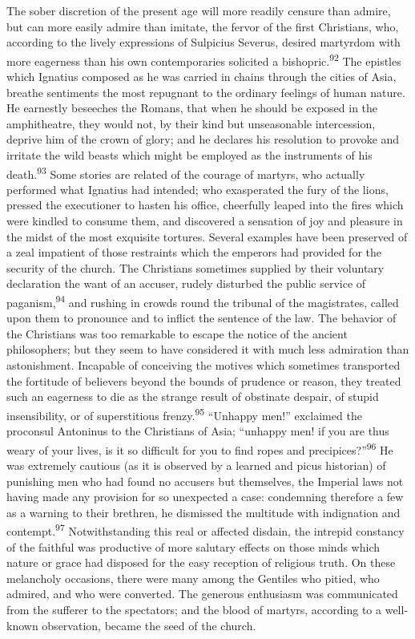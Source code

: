 The sober discretion of the present age will more readily censure
than admire, but can more easily admire than imitate, the fervor
of the first Christians, who, according to the lively expressions
of Sulpicius Severus, desired martyrdom with more eagerness than
his own contemporaries solicited a bishopric.\textsuperscript{92} The epistles
which Ignatius composed as he was carried in chains through the
cities of Asia, breathe sentiments the most repugnant to the
ordinary feelings of human nature. He earnestly beseeches the
Romans, that when he should be exposed in the amphitheatre, they
would not, by their kind but unseasonable intercession, deprive
him of the crown of glory; and he declares his resolution to
provoke and irritate the wild beasts which might be employed as
the instruments of his death.\textsuperscript{93} Some stories are related of the
courage of martyrs, who actually performed what Ignatius had
intended; who exasperated the fury of the lions, pressed the
executioner to hasten his office, cheerfully leaped into the
fires which were kindled to consume them, and discovered a
sensation of joy and pleasure in the midst of the most exquisite
tortures. Several examples have been preserved of a zeal
impatient of those restraints which the emperors had provided for
the security of the church. The Christians sometimes supplied by
their voluntary declaration the want of an accuser, rudely
disturbed the public service of paganism,\textsuperscript{94} and rushing in
crowds round the tribunal of the magistrates, called upon them to
pronounce and to inflict the sentence of the law. The behavior of
the Christians was too remarkable to escape the notice of the
ancient philosophers; but they seem to have considered it with
much less admiration than astonishment. Incapable of conceiving
the motives which sometimes transported the fortitude of
believers beyond the bounds of prudence or reason, they treated
such an eagerness to die as the strange result of obstinate
despair, of stupid insensibility, or of superstitious frenzy.\textsuperscript{95}
“Unhappy men!” exclaimed the proconsul Antoninus to the
Christians of Asia; “unhappy men! if you are thus weary of your
lives, is it so difficult for you to find ropes and precipices?”\textsuperscript{96}
He was extremely cautious (as it is observed by a learned and
picus historian) of punishing men who had found no accusers but
themselves, the Imperial laws not having made any provision for
so unexpected a case: condemning therefore a few as a warning to
their brethren, he dismissed the multitude with indignation and
contempt.\textsuperscript{97} Notwithstanding this real or affected disdain, the
intrepid constancy of the faithful was productive of more
salutary effects on those minds which nature or grace had
disposed for the easy reception of religious truth. On these
melancholy occasions, there were many among the Gentiles who
pitied, who admired, and who were converted. The generous
enthusiasm was communicated from the sufferer to the spectators;
and the blood of martyrs, according to a well-known observation,
became the seed of the church.

